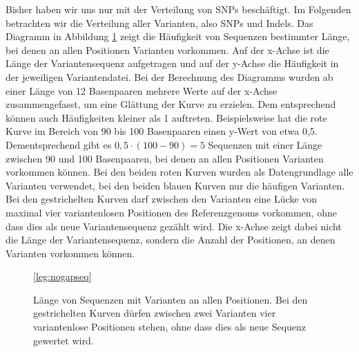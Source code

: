 Bisher haben wir uns nur mit der Verteilung von SNPs beschäftigt. Im Folgenden betrachten wir die Verteilung aller Varianten, also SNPs und Indels. Das Diagramm in Abbildung \ref{fig:stats:nogapseq} zeigt die Häufigkeit von Sequenzen bestimmter Länge, bei denen an allen Positionen Varianten vorkommen. Auf der x-Achse ist die Länge der Variantensequenz aufgetragen und auf der y-Achse die Häufigkeit in der jeweiligen Variantendatei. Bei der Berechnung des Diagramms wurden ab einer Länge von 12 Basenpaaren mehrere Werte auf der x-Achse zusammengefasst, um eine Glättung der Kurve zu erzielen. Dem entsprechend können auch Häufigkeiten kleiner als 1 auftreten. Beispielsweise hat die rote Kurve im Bereich von 90 bis 100 Basenpaaren einen y-Wert von etwa 0,5. Dementsprechend gibt es $0{,}5 \cdot (100 - 90) = 5$ Sequenzen mit einer Länge zwischen 90 und 100 Basenpaaren, bei denen an allen Positionen Varianten vorkommen können. Bei den beiden roten Kurven wurden als Datengrundlage alle Varianten verwendet, bei den beiden blauen Kurven nur die häufigen Varianten. Bei den gestrichelten Kurven darf zwischen den Varianten eine Lücke von maximal vier variantenlosen Positionen des Referenzgenoms vorkommen, ohne dass dies als neue Variantensequenz gezählt wird. Die x-Achse zeigt dabei nicht die Länge der Variantensequenz, sondern die Anzahl der Positionen, an denen Varianten vorkommen können.

\begin{figure}[htbp]
\pgfplotsset{footnotesize,width=12cm,compat=1.8}
\begin{center}
\ref*{leg:nogapseq}
\end{center}
\caption{Länge von Sequenzen mit Varianten an allen Positionen. Bei den gestrichelten Kurven dürfen zwischen zwei Varianten vier variantenlose Positionen stehen, ohne dass dies als neue Sequenz gewertet wird.}
\label{fig:stats:nogapseq}
\end{figure}

